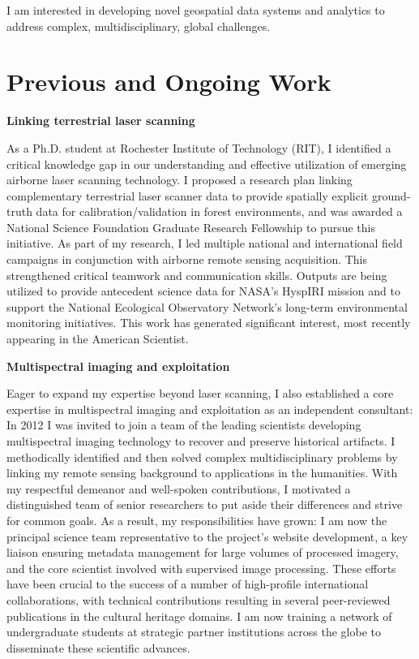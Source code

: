 \documentclass[11pt,letterpaper,sans]{moderncv}
\begin{document}
%
\makecvtitle
\vspace{-18mm}

I am interested in developing novel geospatial data systems and analytics to address complex, multidisciplinary, global challenges.  

\section{Previous and Ongoing Work}

\textbf{Linking terrestrial laser scanning}

As a Ph.D. student at Rochester Institute of Technology (RIT), I identified a critical knowledge gap in our understanding and effective utilization of emerging airborne laser scanning technology. I proposed a research plan linking complementary terrestrial laser scanner data to provide spatially explicit ground-truth data for calibration/validation in forest environments, and was awarded a National Science Foundation Graduate Research Fellowship to pursue this initiative. As part of my research, I led multiple national and international field campaigns in conjunction with airborne remote sensing acquisition. This strengthened critical teamwork and communication skills. Outputs are being utilized to provide antecedent science data for NASA's HyspIRI mission and to support the National Ecological Observatory Network's long-term environmental monitoring initiatives. This work has generated significant interest, most recently appearing in the American Scientist. 
\newline 

\textbf{Multispectral imaging and exploitation}

Eager to expand my expertise beyond laser scanning, I also established a core expertise in multispectral imaging and exploitation as an independent consultant: In 2012 I was invited to join a team of the leading scientists developing multispectral imaging technology to recover and preserve historical artifacts. I methodically identified and then solved complex multidisciplinary problems by linking my remote sensing background to applications in the humanities. With my respectful demeanor and well-spoken contributions, I motivated a distinguished team of senior researchers to put aside their differences and strive for common goals.  As a result, my responsibilities have grown: I am now the principal science team representative to the project's website development, a key liaison ensuring metadata management for large volumes of processed imagery, and the core scientist involved with supervised image processing. These efforts have been crucial to the success of a number of high-profile international collaborations, with technical contributions resulting in several peer-reviewed publications in the cultural heritage domains. I am now training a network of undergraduate students at strategic partner institutions across the globe to disseminate these scientific advances. 
\end{document}
